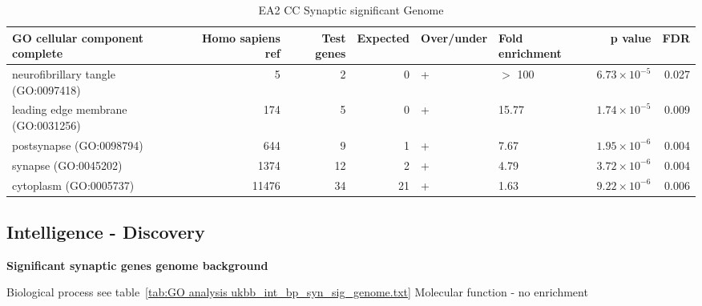 \begin{table}[ht]
\centering
\begin{adjustbox}{width=\textwidth}
\begin{tabular}{lrrrllrr}
  \hline
GO cellular component complete & Homo sapiens ref & Test genes & Expected & Over/under & Fold enrichment & p value & FDR \\ 
  \hline
neurofibrillary tangle (GO:0097418) & 5 & 2 & 0 & + & $>$ 100 & $6.73 \times 10^{-5}$ & 0.027 \\ 
  leading edge membrane (GO:0031256) & 174 & 5 & 0 & + & 15.77 & $1.74 \times 10^{-5}$ & 0.009 \\ 
  postsynapse (GO:0098794) & 644 & 9 & 1 & + & 7.67 & $1.95 \times 10^{-6}$ & 0.004 \\ 
  synapse (GO:0045202) & 1374 & 12 & 2 & + & 4.79 & $3.72 \times 10^{-6}$ & 0.004 \\ 
  cytoplasm (GO:0005737) & 11476 & 34 & 21 & + & 1.63 & $9.22 \times 10^{-6}$ & 0.006 \\ 
   \hline
\end{tabular}
\end{adjustbox}
\caption{EA2 CC Synaptic significant Genome} 
\label{tab:EA2 CC Synaptic significant Genome}
\end{table}




\subsection{Intelligence - Discovery}

\textbf{Significant synaptic genes genome background}

Biological process see table~\ref{tab:GO analysis ukbb_int_bp_syn_sig_genome.txt}
Molecular function - no enrichment

